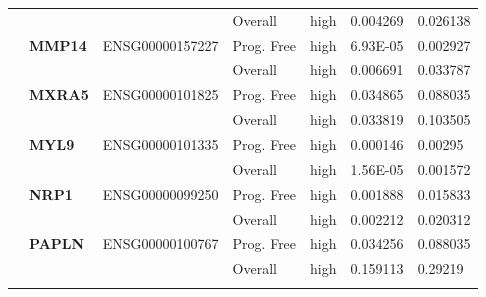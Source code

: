 \begin{spacing}{1}
{\begin{longtable}{|>{\bfseries}p{2cm}|>{\bfseries}p{1.9cm}|p{2.8cm}|p{2cm}|p{2cm}|p{1.5cm}|p{1.5cm}|}
            \hhline{~~~----}
             &          &                 & Overall    & high & 0.004269 & 0.026138 \\
            \hhline{~======}
             & MMP14    & ENSG00000157227 & Prog. Free & high & 6.93E-05 & 0.002927 \\
            \hhline{~~~----}
             &          &                 & Overall    & high & 0.006691 & 0.033787 \\
            \hhline{~======}
             & MXRA5    & ENSG00000101825 & Prog. Free & high & 0.034865 & 0.088035 \\
            \hhline{~~~----}
             &          &                 & Overall    & high & 0.033819 & 0.103505 \\
            \hhline{~======}
             & MYL9     & ENSG00000101335 & Prog. Free & high & 0.000146 & 0.00295  \\
            \hhline{~~~----}
             &          &                 & Overall    & high & 1.56E-05 & 0.001572 \\
            \hhline{~======}
             & NRP1     & ENSG00000099250 & Prog. Free & high & 0.001888 & 0.015833 \\
            \hhline{~~~----}
             &          &                 & Overall    & high & 0.002212 & 0.020312 \\
            \hhline{~======}
             & PAPLN    & ENSG00000100767 & Prog. Free & high & 0.034256 & 0.088035 \\
            \hhline{~~~----}
             &          &                 & Overall    & high & 0.159113 & 0.29219  \\
            \hhline{~======}


\end{longtable}}
\end{spacing}
